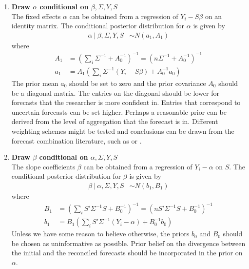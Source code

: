 \documentclass[a4paper,fleqn,11pt]{article}
\begin{document}
\begin{enumerate}
\item \textbf{Draw $\alpha$ conditional on $\beta,\Sigma,Y,S$}\\
The fixed effects $\alpha$ can be obtained from a regression of $Y_i - S\beta$ on an identity matrix. The conditional posterior distribution for $\alpha$ is given by
\begin{align}
\alpha\ |\ \beta,\Sigma,Y,S &\sim N(a_1,A_1)
\end{align}
where
\begin{align*}
A_1 &= \left(\sum_i \Sigma^{-1} + A_0^{-1}\right)^{-1} = \left(n\Sigma^{-1} + A_0^{-1} \right)^{-1}\\
a_1 &= A_1 \left(\sum_i \Sigma^{-1} (Y_i - S\beta) + A_0^{-1}a_0\right)
\end{align*}
The prior mean $a_0$ should be set to zero and the prior covariance $A_0$ should be a diagonal matrix. The entries on the diagonal should be lower for forecasts that the researcher is more confident in. Entries that correspond to uncertain forecasts can be set higher. Perhaps a reasonable prior can be derived from the level of aggregation that the forecast is in. Different weighting schemes might be tested and conclusions can be drawn from the forecast combination literature, such as \cite{Cesur2016} or \cite{Brooks2001}.\\

\item \textbf{Draw $\beta$ conditional on $\alpha,\Sigma,Y,S$}\\
The slope coefficients $\beta$ can be obtained from a regression of $Y_i - \alpha$ on $S$. The conditional posterior distribution for $\beta$ is given by
\begin{align}
\beta\ |\ \alpha,\Sigma,Y,S &\sim N(b_1,B_1)
\end{align}
where
\begin{align*}
B_1 &= \left(\sum_i S'\Sigma^{-1}S + B_0^{-1}\right)^{-1} = \left(nS'\Sigma^{-1}S + B_0^{-1} \right)^{-1}\\
b_1 &= B_1 \left(\sum_i S'\Sigma^{-1} (Y_i - \alpha) + B_0^{-1}b_0\right)
\end{align*}
Unless we have some reason to believe otherwise, the priors $b_0$ and $B_0$ should be chosen as uninformative as possible. Prior belief on the divergence between the initial and the reconciled forecasts should be incorporated in the prior on $\alpha$. \\


\end{enumerate}
\end{document}
